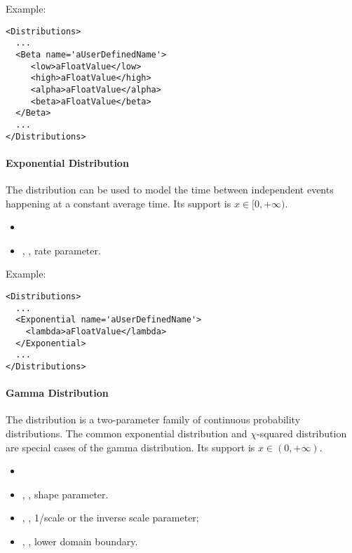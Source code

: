 Example:
\begin{lstlisting}[style=XML]
<Distributions>
  ...
  <Beta name='aUserDefinedName'>
     <low>aFloatValue</low>
     <high>aFloatValue</high>
     <alpha>aFloatValue</alpha>
     <beta>aFloatValue</beta>
  </Beta>
  ...
</Distributions>
\end{lstlisting}

\paragraph{Exponential Distribution}
\label{Exponential}
The  distribution can be
used to model the time between independent events happening at a constant
average time.
%
Its support is $x \in [0, +\infty)$.

%
\attrIntro
\vspace{-5mm}
\begin{itemize}
  \itemsep0em
  \item \nameDescription
\end{itemize}
\vspace{-5mm}
\subnodeIntro
\begin{itemize}
  \item {}, , rate parameter.
\end{itemize}

Example:
\begin{lstlisting}[style=XML]
<Distributions>
  ...
  <Exponential name='aUserDefinedName'>
    <lambda>aFloatValue</lambda>
  </Exponential>
  ...
</Distributions>
\end{lstlisting}

\paragraph{Gamma Distribution}
\label{Gamma}
The  distribution is a two-parameter family of continuous
probability distributions.
%
The common exponential distribution and $\chi$-squared distribution are special
cases of the gamma distribution.
%
Its support is $x \in (0,+\infty)$.

%
\attrIntro
\vspace{-5mm}
\begin{itemize}
  \itemsep0em
  \item \nameDescription
\end{itemize}
\vspace{-5mm}
\subnodesIntro
\begin{itemize}
  \item {}, , shape parameter.
  \item {}, , 1/scale or the
  inverse scale parameter;
  \item {}, , lower domain
  boundary.
\end{itemize}

